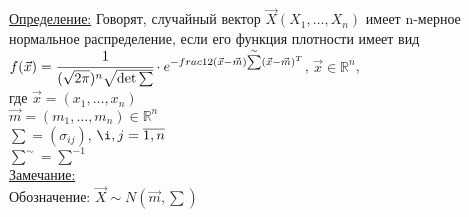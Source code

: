 

\underline{Определение:} Говорят, случайный вектор $\vec{X}(X_1, \ldots, X_n)$ имеет n-мерное нормальное распределение, если его функция плотности имеет вид\\
$f(\vec{x}) = \cfrac{1}{(\sqrt{2\pi})^n \sqrt{\det{\sum}}} \cdot e^{-frac12 (\vec{x} - \vec{m}) \overset{\sim}{\sum} (\vec{x} - \vec{m})^T}$, $\vec{x} \in \mathbb{R}^n$,\\
где $\vec{x} = (x_1, \ldots, x_n)$\\
$\vec{m} = (m_1, \ldots, m_n) \in \mathbb{R}^n$\\
$\sum = (\sigma_{ij})$, $\i,j = \overline{1, n}$\\
$\overset{\sim}{\sum} = \sum^{-1}$\\


\underline{Замечание:}\\
Обозначение: $\vec{X} \sim N(\vec{m}, \sum)$\\


